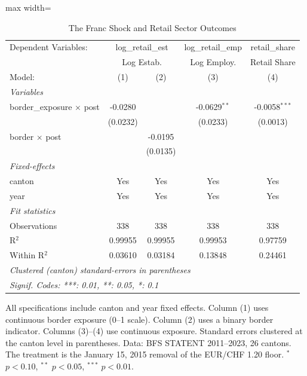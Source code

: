 
\begin{table}[htbp]
   \caption{\label{tab:main_did} The Franc Shock and Retail Sector Outcomes}
   \centering
   \begin{adjustbox}{max width=\textwidth}
   \begin{tabular}{lcccc}
      \tabularnewline \midrule \midrule
      Dependent Variables: & \multicolumn{2}{c}{log\_retail\_est} & log\_retail\_emp & retail\_share\\
       & \multicolumn{2}{c}{Log Estab.} & Log Employ. & Retail Share \\ 
      Model:                           & (1)      & (2)      & (3)            & (4)\\  
      \midrule
      \emph{Variables}\\
      border\_exposure $\times$ post   & -0.0280  &          & -0.0629$^{**}$ & -0.0058$^{***}$\\   
                                       & (0.0232) &          & (0.0233)       & (0.0013)\\   
      border $\times$ post             &          & -0.0195  &                &   \\   
                                       &          & (0.0135) &                &   \\   
      \midrule
      \emph{Fixed-effects}\\
      canton                           & Yes      & Yes      & Yes            & Yes\\  
      year                             & Yes      & Yes      & Yes            & Yes\\  
      \midrule
      \emph{Fit statistics}\\
      Observations                     & 338      & 338      & 338            & 338\\  
      R$^2$                            & 0.99955  & 0.99955  & 0.99953        & 0.97759\\  
      Within R$^2$                     & 0.03610  & 0.03184  & 0.13848        & 0.24461\\  
      \midrule \midrule
      \multicolumn{5}{l}{\emph{Clustered (canton) standard-errors in parentheses}}\\
      \multicolumn{5}{l}{\emph{Signif. Codes: ***: 0.01, **: 0.05, *: 0.1}}\\
   \end{tabular}
   \end{adjustbox}

   \par \raggedright 
   All specifications include canton and year fixed effects. Column (1) uses continuous border exposure (0--1 scale). Column (2) uses a binary border indicator. Columns (3)--(4) use continuous exposure. Standard errors clustered at the canton level in parentheses. Data: BFS STATENT 2011--2023, 26 cantons. The treatment is the January 15, 2015 removal of the EUR/CHF 1.20 floor. $^{*}$ $p<0.10$, $^{**}$ $p<0.05$, $^{***}$ $p<0.01$.
\end{table}
